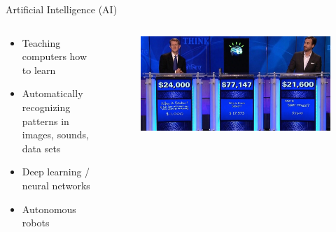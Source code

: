 \documentclass{beamer}
\begin{document}
\begin{frame}{Artificial Intelligence (AI)}
\begin{columns}
	\begin{column}{.40\textwidth}
		\begin{itemize}
			\item Teaching computers how to learn
			\item Automatically recognizing patterns in images, sounds, data sets
			\item Deep learning / neural networks
			\item Autonomous robots
		\end{itemize}
	\end{column}
	\begin{column}{.60\textwidth}
		\begin{figure}
			\includegraphics[width=\linewidth]{img/watson.jpg}
		\end{figure}
	\end{column}
\end{columns}
\end{frame}
\end{document}

